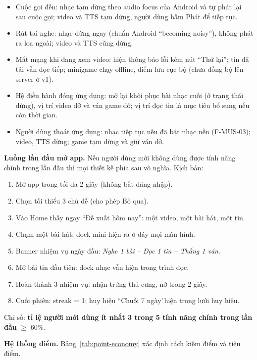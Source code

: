 \begin{itemize}
    \item Cuộc gọi đến: nhạc tạm dừng theo audio focus của Android và tự phát lại sau cuộc gọi; video và TTS tạm dừng, người dùng bấm Phát để tiếp tục.
    \item Rút tai nghe: nhạc dừng ngay (chuẩn Android ``becoming noisy''), không phát ra loa ngoài; video và TTS cũng dừng.
    \item Mất mạng khi đang xem video: hiện thông báo lỗi kèm nút ``Thử lại''; tin đã tải vẫn đọc tiếp; minigame chạy offline, điểm lưu cục bộ (chưa đồng bộ lên server ở v1).
    \item Hệ điều hành đóng ứng dụng: mở lại khôi phục bài nhạc cuối (ở trạng thái dừng), vị trí video dở và ván game dở; vị trí đọc tin là mục tiêu bổ sung nếu còn thời gian.
    \item Người dùng thoát ứng dụng: nhạc tiếp tục nếu đã bật nhạc nền (F-MUS-03); video, TTS dừng; game tạm dừng và giữ ván dở.
\end{itemize}

\textbf{Luồng lần đầu mở app.} Nếu người dùng mới không dùng được tính năng chính trong lần đầu thì mọi thiết kế phía sau vô nghĩa. Kịch bản:

\begin{enumerate}
    \item Mở app trong tối đa 2 giây (không bắt đăng nhập).
    \item Chọn tối thiểu 3 chủ đề (cho phép Bỏ qua).
    \item Vào Home thấy ngay ``Đề xuất hôm nay'': một video, một bài hát, một tin.
    \item Chạm một bài hát: dock mini hiện ra ở đáy mọi màn hình.
    \item Banner nhiệm vụ ngày đầu: \textit{Nghe 1 bài -- Đọc 1 tin -- Thắng 1 ván}.
    \item Mở bài tin đầu tiên: dock nhạc vẫn hiện trong trình đọc.
    \item Hoàn thành 3 nhiệm vụ: nhận trứng thú cưng, nở trong 2 giây.
    \item Cuối phiên: streak = 1; huy hiệu ``Chuỗi 7 ngày'\,hiện trong lưới huy hiệu.
\end{enumerate}

Chỉ số: \textbf{tỉ lệ người mới dùng ít nhất 3 trong 5 tính năng chính trong lần đầu} $\geq$ 60\%.

\textbf{Hệ thống điểm.} Bảng~\ref{tab:point-economy} xác định cách kiếm điểm và tiêu điểm.

